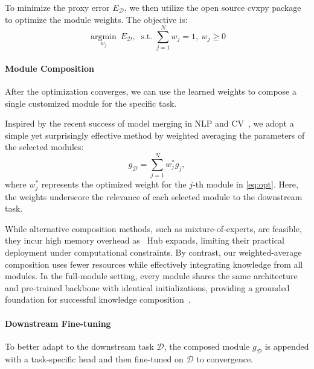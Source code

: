 To minimize the proxy error $E_\mathcal{D}$, we then utilize the open source cvxpy package~\citep{cvxpy} to optimize the module weights. The objective is:
\begin{equation}
\label{eq:opt}
\underset{w_j}{\operatorname{argmin}}\ E_\mathcal{D}, \ \text { s.t. }  \sum_{j=1}^N w_j = 1, \ w_j \geq 0
\end{equation}

\paragraph{Module Composition}
After the optimization converges, we can use the learned weights to compose a single customized module for the specific task. 

Inspired by the recent success of model merging in NLP and CV~\cite{wortsman2022model, ilharco2022editing, yu2024language, li2024training, yang2024model}, we adopt a simple yet surprisingly effective method by weighted averaging the parameters of the selected modules: 
\begin{equation}
    g_\mathcal{D} = \sum_{j=1}^N w_j^{*} g_j,
\end{equation}
 where $w_j^{*}$ represents the optimized weight for the $j$-th module in \cref{eq:opt}. Here, the weights underscore the relevance of each selected module to the downstream task. 



While alternative composition methods, such as mixture-of-experts, are feasible, they incur high memory overhead as \name \ Hub expands, limiting their practical deployment under computational constraints. By contrast, our weighted-average composition uses fewer resources while effectively integrating knowledge from all modules. In the full-module setting, every module shares the same architecture and pre-trained backbone with identical initializations, providing a grounded foundation for successful knowledge composition~\cite{zhouemergence2024}.

\paragraph{Downstream Fine-tuning}
\label{sec:DA}
To better adapt to the downstream task $\mathcal{D}$, the composed module $g_\mathcal{D}$ is appended with a task-specific head and then fine-tuned on $\mathcal{D}$ to convergence.